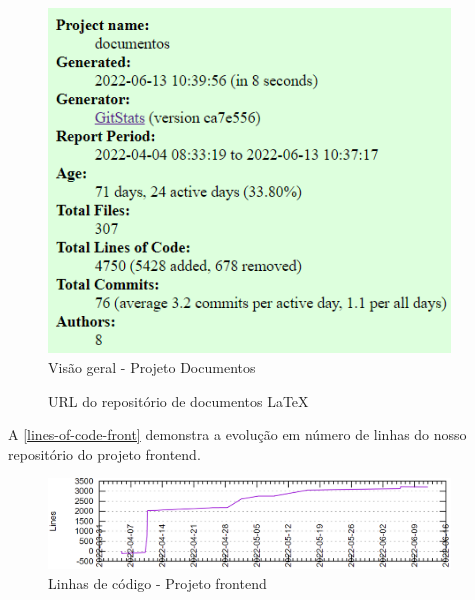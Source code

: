 \begin{figure}[H]
	\centering
	\caption{\label{overview-doc}Visão geral - Projeto Documentos}
	\includegraphics[width=0.95\textwidth]{../imagens/stats/overview-documentos.png}
\end{figure}

\begin{figure}[htb]
	\caption{\label{qr-url-doc}URL do repositório de documentos \LaTeX}
	\begin{center}
	\end{center}
\end{figure}

A \autoref{lines-of-code-front} demonstra a evolução em número de linhas do nosso repositório do projeto \gls{frontend}.
\begin{figure}[H]
	\centering
	\caption{\label{lines-of-code-front}Linhas de código - Projeto \gls{frontend}}
	\includegraphics[width=0.95\textwidth]{../imagens/stats/lines-of-code-frontend.png}
\end{figure}

